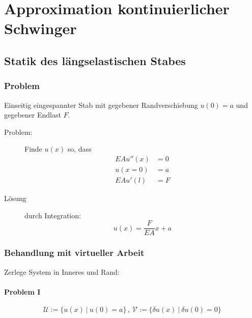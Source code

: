 
\section{Approximation kontinuierlicher Schwinger} %
	\subsection{Statik des längselastischen Stabes} %
		\subsubsection{Problem} %
			Einseitig eingespannter Stab mit gegebener Randverschiebung $u(0) = a$ und gegebener Endlast $F$.
			
			\resizebox{\columnwidth}{!}{
				
			}
			
			\begin{description}
				\item[Problem:] Finde $u(x)$ so, dass
					\begin{equation} \label{eq:stab_bed}
						\begin{split}
								EAu''(x) &= 0 \\
								u(x=0) &= a \\
								EAu'(l) &= F
						\end{split}
					\end{equation}
				
				\item[Lösung] durch Integration:
					\[
						u(x) = \frac{F}{EA} x + a
					\]
			\end{description}
		
		\subsubsection{Behandlung mit virtueller Arbeit} %
			Zerlege System in Inneres und Rand:
			
			\resizebox{\columnwidth}{!}{
				
			}
			
			\paragraph{Problem I} %
				\[
					\mathcal{U} := \{
						u(x) \ | \ u(0) = a
					\} \, , \ 
					\mathcal{V} := \{
						\delta u(x) \ | \ \delta u(0) = 0
					\}
				\]
				
